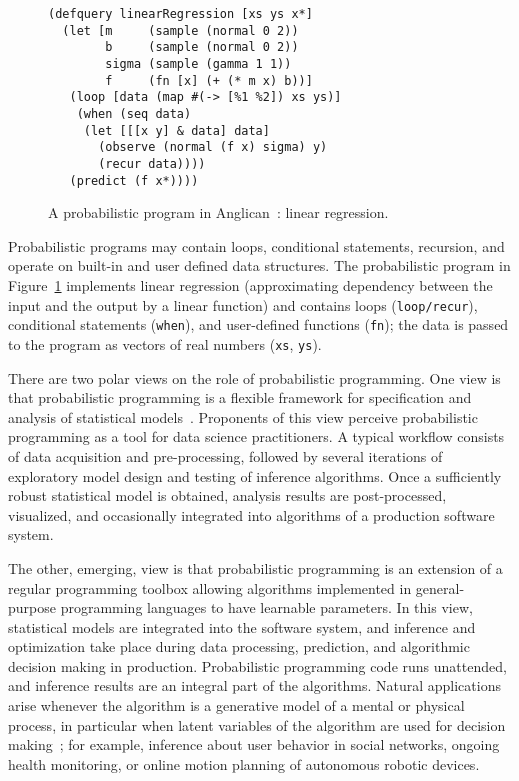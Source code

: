 \documentclass[sigplan,screen]{acmart}
\begin{document}
\begin{sloppypar}
  \begin{figure}
    \begin{lstlisting}[language=Anglican]
(defquery linearRegression [xs ys x*]
  (let [m     (sample (normal 0 2))
        b     (sample (normal 0 2))
        sigma (sample (gamma 1 1))
        f     (fn [x] (+ (* m x) b))]
   (loop [data (map #(-> [%1 %2]) xs ys)]
    (when (seq data)
     (let [[[x y] & data] data] 
       (observe (normal (f x) sigma) y)
       (recur data))))
   (predict (f x*))))
    \end{lstlisting}
    \caption{A probabilistic program in Anglican~\cite{TMY+16}:
    linear regression.}
    \label{fig:linreg-anglican}
  \end{figure}
  Probabilistic programs may contain loops, conditional
  statements, recursion, and operate on built-in and user
  defined data structures. The probabilistic program in
  Figure~\ref{fig:linreg-anglican} implements linear regression
  (approximating dependency between the input and the output by
  a linear function) and contains loops
  (\lstinline[language=Anglican]{loop/recur}), conditional
  statements (\lstinline[language=Anglican]{when}), and
  user-defined functions (\lstinline[language=Anglican]{fn});
  the data is passed to the program as vectors of real numbers
  (\lstinline[language=Anglican]{xs}, \lstinline[language=Anglican]{ys}).
  
  There are two polar views on the role of probabilistic
  programming.  One view is that probabilistic programming is
  a flexible framework for specification and analysis of
  statistical models~\cite{WSG11,TMY+16,GXG18}.  Proponents of
  this view perceive probabilistic programming as a tool for
  data science practitioners. A typical workflow consists of
  data acquisition and pre-processing, followed by several
  iterations of exploratory model design and testing of
  inference algorithms. Once a sufficiently robust statistical
  model is obtained, analysis results are post-processed,
  visualized, and occasionally integrated into algorithms of a
  production software system.

  The other, emerging, view is that probabilistic programming
  is an extension of a regular programming toolbox allowing
  algorithms implemented in general-purpose programming
  languages to have learnable parameters. In this view,
  statistical models are integrated into the software system,
  and inference and optimization take place during data
  processing, prediction, and algorithmic decision making in
  production.  Probabilistic programming code runs unattended,
  and inference results are an integral part of the
  algorithms. Natural applications arise whenever the algorithm
  is a generative model of a mental or physical process, in
  particular when latent variables of the algorithm are used for
  decision making~\cite{GT+16,WBD+19}; for example, inference
  about user behavior in social networks, ongoing health
  monitoring, or online motion planning of autonomous robotic
  devices.


\end{sloppypar}
\end{document}
